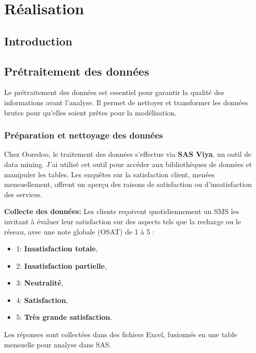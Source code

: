 \chapter{Réalisation}
\begin{spacing}{1.2}
\minitoc
\thispagestyle{MyStyle}
\end{spacing}
\newpage
\justifying

\section{Introduction}
\section{Prétraitement des données}

Le prétraitement des données est essentiel pour garantir la qualité des informations avant l'analyse. Il permet de nettoyer et transformer les données brutes pour qu'elles soient prêtes pour la modélisation.

\subsection{Préparation et nettoyage des données}

Chez Ooredoo, le traitement des données s'effectue via \textbf{SAS Viya}, un outil de data mining. J'ai utilisé cet outil pour accéder aux bibliothèques de données et manipuler les tables. Les enquêtes sur la satisfaction client, menées mensuellement, offrent un aperçu des raisons de satisfaction ou d'insatisfaction des services.

\textbf{Collecte des données:}
Les clients reçoivent quotidiennement un SMS les invitant à évaluer leur satisfaction sur des aspects tels que la recharge ou le réseau, avec une note globale (OSAT) de 1 à 5 :
\begin{itemize}
    \item 1: \textbf{Insatisfaction totale},
    \item 2: \textbf{Insatisfaction partielle},
    \item 3: \textbf{Neutralité},
    \item 4: \textbf{Satisfaction},
    \item 5: \textbf{Très grande satisfaction}.
\end{itemize}

Les réponses sont collectées dans des fichiers Excel, fusionnés en une table mensuelle pour analyse dans SAS.

